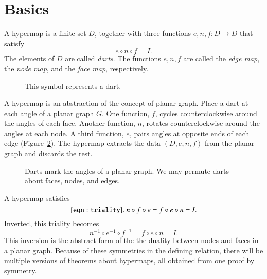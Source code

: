 


\section{Basics}



\begin{definition}[hypermap]  A hypermap is a finite set $D$, together with
three functions $e,n,f:D\to D$ that satisfy
    $$e\circ n\circ f = I.$$
The elements of $D$ are called {\it darts}.  The functions $e,n,f$
are called the {\it edge map}, the {\it node map}, and the {\it
face map}, respectively.
\end{definition}


\begin{figure}[htb]
  \centering
  \caption{This symbol represents a dart.}
  \label{fig:dart}
\end{figure}

\begin{remark} A hypermap is an abstraction of
the concept of 
planar graph.  Place a dart at each angle of a planar graph $G$.
One function, $f$, 
cycles counterclockwise around the angles of each face.  
Another function, $n$, 
rotates counterclockwise around the angles at each
node.  A third function, $e$, pairs angles at opposite ends of
each edge  (Figure~\ref{fig:hypermap_ex}).   The hypermap extracts
the data $(D,e,n,f)$ from the planar graph and discards the rest.
\end{remark}

\begin{figure}[htb]
  \centering
  \caption{Darts mark the angles of a planar graph.  We may
  permute darts about faces, nodes, and edges.}
  \label{fig:hypermap_ex}
\end{figure}

A hypermap satisfies 
  \begin{equation}\tlabel{eqn:triality}
  n\circ f\circ e = f\circ e\circ n = I.
  \end{equation}
Inverted, this triality becomes
   $$
   n^{-1} \circ e^{-1} \circ f^{-1} = f \circ e \circ n = I.
   $$
This inversion
is the abstract form of the
the duality between nodes and faces in a planar graph.  
Because of
these symmetries in the defining relation, 
there will be multiple versions of 
theorems about hypermaps,
all obtained from one proof by symmetry.


